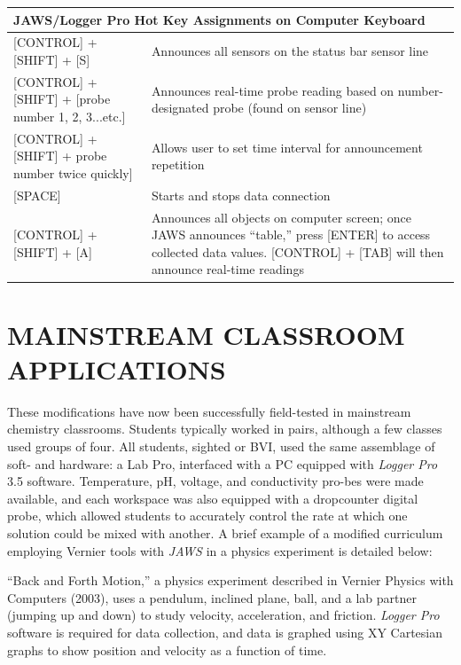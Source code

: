 \documentclass[11.5pt]{sig-alternate} %
\begin{document}
\begin{large}
\begin{table}[h]
\begin{tabular}{|l|l|}
\hline
\multicolumn{2}{|l|}{\textbf{JAWS/Logger Pro Hot Key Assignments on Computer Keyboard}} \\ \hline
{[}CONTROL{]} + {[}SHIFT{]} + {[}S{]} & Announces all sensors on the status bar sensor line \\ \hline
{[}CONTROL{]} + {[}SHIFT{]} + {[}probe number 1, 2, 3...etc.{]} & Announces real-time probe reading based on number-designated probe (found on sensor line) \\ \hline
{[}CONTROL{]} + {[}SHIFT{]} + probe number twice quickly{]} & Allows user to set time interval for announcement repetition \\ \hline
{[}SPACE{]} & Starts and stops data connection \\ \hline
{[}CONTROL{]} + {[}SHIFT{]} + {[}A{]} & Announces all objects on computer screen; once JAWS announces ``table,'' press {[}ENTER{]} to access collected data values. {[}CONTROL{]} + {[}TAB{]} will then announce real-time readings \\ \hline
\end{tabular}
\end{table}

\section*{MAINSTREAM CLASSROOM \\APPLICATIONS }
 
These modifications have now been successfully field-tested in mainstream chemistry classrooms. Students typically worked in pairs, although a few classes used groups of four. All students, sighted or BVI, used the same assemblage of soft- and hardware: a Lab Pro, interfaced with a PC equipped with \textit{Logger Pro} 3.5 software. Temperature, pH, voltage, and conductivity pro-bes were made available, and each workspace was also equipped with a dropcounter digital probe, which allowed students to accurately control the rate at which one solution could be mixed with another.   A brief example of a modified curriculum employing Vernier tools with \textit{JAWS} in a physics experiment is detailed below: 
 
“Back and Forth Motion,” a physics experiment described in Vernier Physics with Computers (2003), uses a pendulum, inclined plane, ball, and a lab partner (jumping up and down) to study velocity, acceleration, and friction. \textit{Logger Pro} software is required for data collection, and data is graphed using XY Cartesian graphs to show position and velocity as a function of time. 
 

\end{large}
\end{document}
